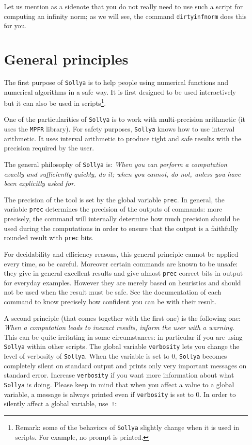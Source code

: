 \documentclass[a4paper]{article}
\newcommand{\com}[1]{\texttt{#1}}
\newcommand{\key}[1]{\texttt{#1}}
\newcommand{\sollya}{\texttt{Sollya}\xspace}
\begin{document}
Let us mention as a sidenote that you do not really need to use such a script for computing an infinity norm; as we will see, the command \com{dirtyinfnorm} does this for you.

\section{General principles}\label{sec:general_principles}
The first purpose of \sollya is to help people using numerical functions and numerical algorithms in a safe way. It is first designed to be used interactively but it can also be used in scripts\footnote{Remark: some of the behaviors of \sollya slightly change when it is used in scripts. For example, no prompt is printed.}.

One of the particularities of \sollya is to work with multi-precision arithmetic (it uses the \texttt{MPFR} library). For safety purposes, \sollya knows how to use interval arithmetic. It uses interval arithmetic to produce tight and safe results with the precision required by the user.

The general philosophy of \sollya is: \emph{When you can perform a computation exactly and sufficiently quickly, do it; when you cannot, do not, unless you have been explicitly asked for.}

The precision of the tool is set by the global variable \key{prec}. In general, the variable \key{prec} determines the precision of the outputs of commands: more precisely, the command will internally determine how much precision should be used during the computations in order to ensure that the output is a faithfully rounded result with \key{prec} bits.

For decidability and efficiency reasons, this general principle cannot be applied every time, so be careful. Moreover certain commands are known to be unsafe: they give in general excellent results and give almost \key{prec} correct bits in output for everyday examples. However they are merely based on heuristics and should not be used when the result must be safe. See the documentation of each command to know precisely how confident you can be with their result.

A second principle (that comes together with the first one) is the following one: \emph{When a computation leads to inexact results, inform the user with a warning}. This can be quite irritating in some circumstances: in particular if you are using \sollya within other scripts. The global variable \key{verbosity} lets you change the level of verbosity of \sollya. When the variable is set to $0$, \sollya becomes completely silent on standard output and prints only very important messages on standard error. Increase \key{verbosity} if you want more information about what \sollya is doing. Please keep in mind that when you affect a value to a global variable, a message is always printed even if \com{verbosity} is set to $0$. In order to silently affect a global variable, use~\texttt{!}:
\end{document}

